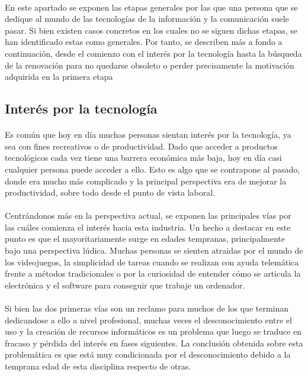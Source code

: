 \documentclass[12pt, a4paper]{report}
\begin{document}
    	\paragraph{}
        En este apartado se exponen las etapas generales por las que una persona que se dedique al mundo de las tecnologías de la información y la comunicación suele pasar. Si bien existen casos concretos en los cuales no se siguen dichas etapas, se han identificado estas como generales. Por tanto, se describen más a fondo a continuación, desde el comienzo con el interés por la tecnología hasta la búsqueda de la renovación para no quedarse obsoleto o perder precisamente la motivación adquirida en la primera etapa


    	\subsection{Interés por la tecnología}
        	\paragraph{}
            Es común que hoy en día muchas personas sientan interés por la tecnología, ya sea con fines recreativos o de productividad. Dado que acceder a productos tecnológicos cada vez tiene una barrera económica más baja, hoy en día casi cualquier persona puede acceder a ello. Esto es algo que se contrapone al pasado, donde era mucho más complicado y la principal perspectiva era de mejorar la productividad, sobre todo desde el punto de vista laboral.
            
            \paragraph{}
			Centrándonos más en la perspectiva actual, se exponen las principales vías por las cuáles comienza el interés hacia esta industria. Un hecho a destacar en este punto es que el mayoritariamente surge en edades tempranas, principalmente bajo una perspectiva lúdica. Muchas personas se sienten atraidas por el mundo de los videojuegos, la simplicidad de tareas cuando se realizan con ayuda telemática frente a métodos tradicionales o por la curiosidad de entender cómo se articula la electrónica y el software para conseguir que trabaje un ordenador. 
            
            \paragraph{}
            Si bien las dos primeras vías son un reclamo para muchos de los que terminan dedicandose a ello a nivel profesional, muchas veces el desconocimiento entre el uso y la creación de recursos informáticos es un problema que luego se traduce en fracaso y pérdida del interés en fases siguientes. La conclusión obtenida sobre esta problemática es que está muy condicionada por el desconocimiento debido a la temprana edad de esta disciplina respecto de otras.
 
\end{document}
